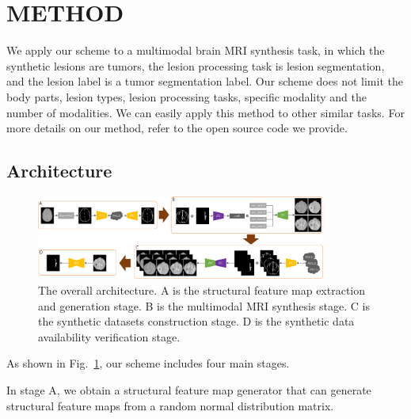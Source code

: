 \documentclass{ecai}
\begin{document}
\section{METHOD}
\label{method}
We apply our scheme to a multimodal brain MRI synthesis task, in which the synthetic lesions are tumors, the lesion processing task is lesion segmentation, and the lesion label is a tumor segmentation label. Our scheme does not limit the body parts, lesion types, lesion processing tasks, specific modality and the number of modalities. We can easily apply this method to other similar tasks. For more details on our method, refer to the open source code we provide.

\subsection{Architecture}
\begin{figure}[t]
	\centering
	\includegraphics[width=0.85\textwidth]{figures/architecture}
	\caption{The overall architecture. A is the structural feature map extraction and generation stage. B is the multimodal MRI synthesis stage. C is the synthetic datasets construction stage. D is the synthetic data availability verification stage.}
	\label{architecture}
\end{figure}
As shown in Fig.~\ref{architecture}, our scheme includes four main stages. 

In stage A, we obtain a structural feature map generator that can generate structural feature maps from a random normal distribution matrix. 
\end{document}
